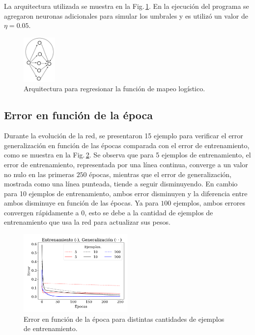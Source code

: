 La arquitectura utilizada se muestra en la Fig.\,\ref{fig:arq-mapeo}. En la ejecución del programa se agregaron neuronas adicionales para simular los umbrales y es utilizó un valor de $\eta=0.05$. 
\begin{figure}[H]
	\centering
	\includegraphics[width=0.15\textwidth]{ejer_3.png}
	\caption{Arquitectura para regresionar la función de mapeo logístico.}
	\label{fig:arq-mapeo}
\end{figure}

\subsection*{Error en función de la época}

Durante la evolución   de la red, se presentaron 15 ejemplo para verificar el error generalización en función de las épocas comparada con el error de entrenamiento, como se muestra en la Fig.\,\ref{fig:log_los_gen}. Se observa que para 5 ejemplos de entrenamiento, el error de entrenamiento, representada por una línea continua, converge a un valor no nulo en las primeras $250$ épocas, mientras que el error de generalización, mostrada como una línea punteada, tiende a seguir disminuyendo. En cambio para 10 ejemplos de entrenamiento, ambos error disminuyen y la diferencia entre ambos disminuye en función de las épocas. Ya para $100$ ejemplos, ambos errores convergen rápidamente a 0, esto se debe a la cantidad de ejemplos de entrenamiento que usa la red para actualizar sus pesos.


\begin{figure}[H]
	\centering
	\includegraphics[width=0.5\textwidth]{../Graficos/ejer_3_los_gen.png}
	\caption{Error en función de la época para distintas cantidades de ejemplos de entrenamiento.}
	\label{fig:log_los_gen}
\end{figure}

